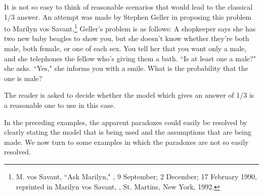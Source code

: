 \begin{example}\label{exam 4.3.3}
It is not so easy to think of reasonable scenarios that would lead to the classical 1/3 answer.
An attempt was made by Stephen Geller in proposing this problem to Marilyn vos
Savant.\footnote{M. vos Savant, ``Ask Marilyn," , 9  September;  2 December;  17  February 1990, reprinted in Marilyn
vos Savant, , St. Martins, New York, 1992.}
Geller's problem is as follows:  A shopkeeper says she has two new baby beagles to show you, but she
doesn't know whether they're both male, both female, or one of each sex.  You tell her that 
you want only a male, and she telephones the fellow who's giving them a bath.  ``Is at least 
one a male?" she asks. ``Yes," she informs you with a smile.  What is the probability that 
the  one is male?
\par
The reader is asked to decide whether the model which gives an answer of 1/3 is a reasonable one 
to use in this case.
\end{example}

In the preceding examples, the apparent paradoxes could easily be resolved by clearly stating
the model that is being used and the assumptions that are being made.  We now turn to some
examples in which the paradoxes are not so easily resolved.

